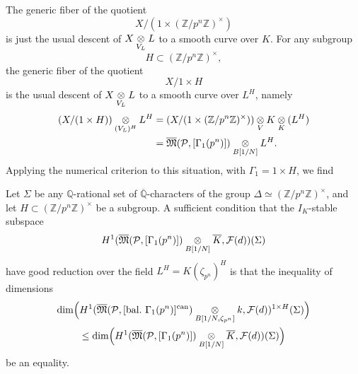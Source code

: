 The generic fiber of the quotient
\[
X/(1 \times (\mathbb{Z}/p^n\mathbb{Z})^\times)
\]
is just the usual descent of $X \underset{V_L}{\otimes} L$ to a smooth curve over $K$. For any subgroup
\[
H \subset (\mathbb{Z}/p^n\mathbb{Z})^\times ,
\]
the generic fiber of the quotient
\[
X/1 \times H
\]
is the usual descent of $X \underset{V_L}{\otimes} L$ to a smooth curve over $L^H$, namely
\begin{align*}
(X/(1 \times H)) \underset{(V_L)^H}{\otimes} L^H &= (X/(1 \times (\mathbb{Z}/p^n\mathbb{Z})^\times)) \underset{V}{\otimes} K \underset{K}{\otimes} (L^H) \\
&= \overline{\mathfrak{M}}(\mathcal{P}, [\Gamma_1(p^n)]) \underset{B[1/N]}{\otimes} L^H .
\end{align*}
Applying the numerical criterion to this situation, with $\Gamma_1 = 1 \times H$, we find

\begin{theorem}\label{thm:14.3.6}
Let $\Sigma$ be any $\mathbb{Q}$-rational set of $\overline{\mathbb{Q}}$-characters of the group $\Delta \simeq (\mathbb{Z}/p^n\mathbb{Z})^\times$, and let $H \subset (\mathbb{Z}/p^n\mathbb{Z})^\times$ be a subgroup. A sufficient condition that the $I_K$-stable subspace
\[
H^1(\overline{\mathfrak{M}}(\mathcal{P}, [\Gamma_1(p^n)]) \underset{B[1/N]}{\otimes} \overline{K}, \mathcal{F}(d))(\Sigma)
\]
have good reduction over the field $L^H = K(\zeta_{p^n})^H$ is that the inequality of dimensions
\begin{multline*}
\dim \Bigl( H^1(\overline{\mathfrak{M}}(\mathcal{P}, [\mathrm{bal.}\ \Gamma_1(p^n)]^{\mathrm{can}}) \tens{B[1/N, \zeta_{p^n}]} k, \mathcal{F}(d))^{1 \times H}(\Sigma) \Bigr) \\
\le \dim \Bigl( H^1(\overline{\mathfrak{M}}(\mathcal{P}, [\Gamma_1(p^n)]) \tens{B[1/N]} \overline{K}, \mathcal{F}(d))(\Sigma) \Bigr)
\end{multline*}
be an equality.
\end{theorem}

